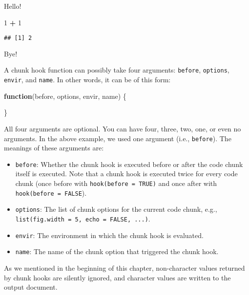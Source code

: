 \documentclass[
  11pt,
]{krantz}
\newenvironment{Shaded}{\begin{snugshade}}{\end{snugshade}}
\newcommand{\ControlFlowTok}[1]{\textcolor[rgb]{0.27,0.27,0.27}{\textbf{#1}}}
\newcommand{\DecValTok}[1]{\textcolor[rgb]{0.06,0.06,0.06}{#1}}
\newcommand{\NormalTok}[1]{#1}
\newcommand{\OperatorTok}[1]{\textcolor[rgb]{0.43,0.43,0.43}{\textbf{#1}}}
\newcommand{\StringTok}[1]{\textcolor[rgb]{0.5,0.5,0.5}{#1}}
\renewenvironment{quote}{\begin{VF}}{\end{VF}}
\begin{document}
\begin{quote}
Hello!

\begin{Shaded}
\begin{Highlighting}[]
\DecValTok{1} \OperatorTok{+}\StringTok{ }\DecValTok{1}
\end{Highlighting}
\end{Shaded}

\begin{verbatim}
## [1] 2
\end{verbatim}

Bye!
\end{quote}

A chunk hook function can possibly take four arguments: \texttt{before}, \texttt{options}, \texttt{envir}, and \texttt{name}. In other words, it can be of this form:

\begin{Shaded}
\begin{Highlighting}[]
\ControlFlowTok{function}\NormalTok{(before, options, envir, name) \{}

\NormalTok{\}}
\end{Highlighting}
\end{Shaded}

All four arguments are optional. You can have four, three, two, one, or even no arguments. In the above example, we used one argument (i.e., \texttt{before}). The meanings of these arguments are:

\begin{itemize}
\item
  \texttt{before}: Whether the chunk hook is executed before or after the code chunk itself is executed. Note that a chunk hook is executed twice for every code chunk (once before with \texttt{hook(before\ =\ TRUE)} and once after with \texttt{hook(before\ =\ FALSE}).
\item
  \texttt{options}: The list of chunk options for the current code chunk, e.g., \texttt{list(fig.width\ =\ 5,\ echo\ =\ FALSE,\ ...)}.
\item
  \texttt{envir}: The environment in which the chunk hook is evaluated.
\item
  \texttt{name}: The name of the chunk option that triggered the chunk hook.
\end{itemize}

As we mentioned in the beginning of this chapter, non-character values returned by chunk hooks are silently ignored, and character values are written to the output document.
\end{document}
